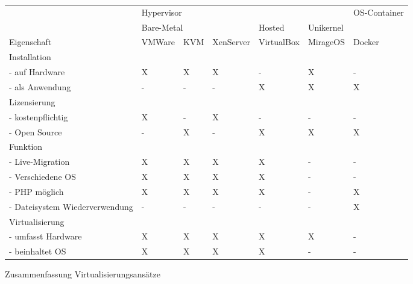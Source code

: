 \begin{figure}[!ht]
  \begin{center}
    \resizebox{15cm}{!} {
      \begin{tabular}{|l|l|l|l|l|l|l|}
      \hline
      {} & \multicolumn{5}{|l|}{Hypervisor} & OS-Container \\
      \cline{2-6}
      {} & \multicolumn{3}{|l|}{Bare-Metal} & Hosted & Unikernel & {} \\
      \hline
      Eigenschaft & VMWare & KVM & XenServer & VirtualBox & MirageOS & Docker \\
      \hline
      Installation & \multicolumn{6}{|l|}{} \\
      \hline
      - auf Hardware & X & X & X & - & X & - \\
      \hline
      - als Anwendung & - & - & - & X & X & X \\
      \hline
      Lizensierung & \multicolumn{6}{|l|}{} \\
      \hline
      - kostenpflichtig & X & - & X & - & - & - \\
      \hline
      - Open Source & - & X & - & X & X & X \\
      \hline
      Funktion & \multicolumn{6}{|l|}{} \\
      \hline
      - Live-Migration & X & X & X & X & - & - \\
      \hline
      - Verschiedene OS & X & X & X & X & - & - \\
      \hline
      - PHP möglich & X & X & X & X & - & X \\
      \hline
      - Dateisystem Wiederverwendung & - & - & - & - & - & X \\
      \hline
      Virtualisierung & \multicolumn{6}{|l|}{} \\
      \hline
      - umfasst Hardware & X & X & X & X & X & - \\
      \hline
      - beinhaltet OS & X & X & X & X & - & - \\      
      \hline
      \end{tabular}
    }
    \caption{Zusammenfassung Virtualisierungsansätze}
    \label{zusammenfassung-virtualisierung}
  \end{center}
\end{figure}